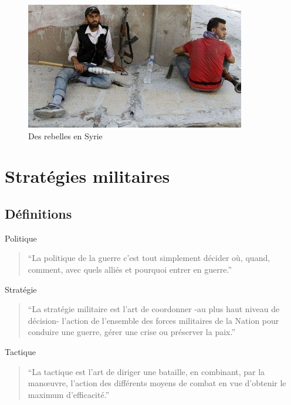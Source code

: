 \documentclass{article}
\begin{document}
\begin{figure}[H]
	\begin{centering}
	\includegraphics[]{../ressources/rebel_syrie}
	\caption{Des rebelles en Syrie \cite{rebel_syrie}}
	\end{centering}
\end{figure}


\section{Stratégies militaires}

\subsection{Définitions}
Politique \cite{politique_jomini}
\begin{quote}“La politique de la guerre c’est tout simplement décider où, quand, comment, avec quels alliés et pourquoi entrer en guerre.”\end{quote}

Stratégie \cite{military_strategy}
\begin{quote}“La stratégie militaire est l'art de coordonner -au plus haut niveau de décision- l'action de l'ensemble des forces militaires de la Nation pour conduire une guerre, gérer une crise ou préserver la paix.”\end{quote}

Tactique \cite{tactic}
\begin{quote}“La tactique est l'art de diriger une bataille, en combinant, par la manœuvre, l'action des différents moyens de combat en vue d'obtenir le maximum d'efficacité.”\end{quote}
\end{document}
